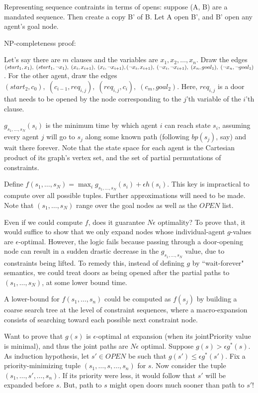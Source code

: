 \documentclass[letterpaper]{article}
\begin{document}
Representing sequence contraints in terms of opens: suppose (A, B) are a mandated sequence. Then create a copy B' of B. Let A open B', and B' open any agent's goal node.

NP-completeness proof:

Let's say there are $m$ clauses and the variables are $x_1,x_2,\ldots,x_n$. Draw the edges $(start_1,x_1),\;(start_1,\neg x_1),\;(x_i,x_{i+1}),\;(x_i,\neg x_{i+1}),\;\\(\neg x_i,x_{i+1}),\;(\neg x_i,\neg x_{i+1}),\;(x_n,goal_1),\;(\neg x_n,\neg goal_1)$. For the other agent, draw the edges $(start_2,c_0),\;(c_{i-1},req_{i,j}),\;(req_{i,j},c_i),\;(c_m,goal_2)$. Here, $req_{i,j}$ is a door that needs to be opened by the node corresponding to the $j$'th variable of the $i$'th clause.

$g_{s_1,\ldots,s_N}(s_i)$ is the minimum time by which agent $i$ can reach state $s_i$, assuming every agent $j$ will go to $s_j$ along some known path (following $bp(s_j)$, say) and wait there forever. Note that the state space for each agent is the Cartesian product of its graph's vertex set, and the set of partial permutations of constraints.

Define $f(s_1,\ldots,s_N) = \max_i g_{s_1,\ldots,s_N}(s_i) + \epsilon h(s_i)$. This key is impractical to compute over all possible tuples. Further approximations will need to be made. Note that $(s_1,\ldots,s_N)$ range over the goal nodes as well as the $OPEN$ list.

Even if we could compute $f$, does it guarantee $N\epsilon$ optimality? To prove that, it would suffice to show that we only expand nodes whose individual-agent $g$-values are $\epsilon$-optimal. However, the logic fails because passing through a door-opening node can result in a sudden drastic decrease in the $g_{s_1,\ldots,s_N}$ value, due to constraints being lifted. To remedy this, instead of defining $g$ by ``wait-forever" semantics, we could treat doors as being opened after the partial paths to $(s_1,\ldots,s_N)$, at some lower bound time.

A lower-bound for $f(s_1,\ldots,s_n)$ could be computed as $f(s_j)$ by building a coarse search tree at the level of constraint sequences, where a macro-expansion consists of searching toward each possible next constraint node.

Want to prove that $g(s)$ is $\epsilon$-optimal at expansion (when its jointPriority value is minimal), and thus the joint paths are $N\epsilon$ optimal. Suppose $g(s) > \epsilon g^*(s)$. As induction hypothesis, let $s'\in OPEN$ be such that $g(s') \le \epsilon g^*(s')$. Fix a priority-minimizing tuple $(s_1,\ldots,s,\ldots,s_n)$ for $s$. Now consider the tuple $(s_1,\ldots,s',\ldots,s_n)$. If its priority were less, it would follow that $s'$ will be expanded before $s$. But, path to $s$ might open doors much sooner than path to $s'$!
\end{document}

